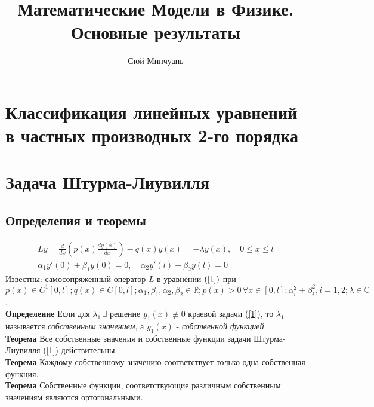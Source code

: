 \documentclass{article}
\begin{document}
\author{Сюй Минчуань}
\title{Математические Модели в Физике. \\
Основные результаты}
\maketitle
\tableofcontents
\newpage

\section{Классификация линейных уравнений в частных производных 2-го порядка}
\section{Задача Штурма-Лиувилля}
\subsection{Определения и теоремы}
\begin{equation}
\label{1}
\begin{aligned}
Ly=\frac{d}{dx}\left(p(x)\frac{dy(x)}{dx}\right)-q(x)y(x)=-\lambda y(x), \quad 0\le x\le l\\
\alpha_1y'(0)+\beta_1 y(0)=0,\quad \alpha_2y'(l)+\beta_2 y(l)=0
\end{aligned}
\end{equation}
Известны: самосопряженный оператор $L$ в уравнении $(\ref{1})$ при $p(x)\in C^1[0,l]; q(x)\in C[0,l]; \alpha_1,\beta_1,\alpha_2,\beta_2\in \mathbb{R};p(x)>0\,\forall x\in[0,l];\alpha_i^2+\beta_i^2,i=1,2;\lambda\in \mathbb{C}$.\\

\noindent\textbf{Определение} Если для $\lambda_1\,\exists$ решение $y_1(x)\not\equiv0$ краевой задачи (\ref{1}), то $\lambda_1$ называется \emph{собственным значением}, а $y_1(x)$ - \emph{собственной функцией}.\\

\noindent\textbf{Теорема} Все собственные значения и собственные функции задачи Штурма-Лиувилля (\ref{1}) действительны.\\

\noindent\textbf{Теорема} Каждому собственному значению соответствует только одна собственная функция.\\

\noindent\textbf{Теорема} Собственные функции, соответствующие различным собственным значениям являются ортогональными.\\
\end{document}
